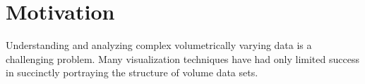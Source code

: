 
\section{Motivation \label{motivation}}
Understanding and analyzing complex volumetrically varying data is a challenging problem.
Many visualization techniques have had only limited success in succinctly portraying the structure of volume data sets.

